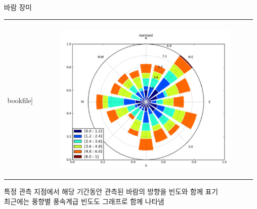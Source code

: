 \begin{frame}[t]{바람 장미}
	\begin{tabular}{ll}
		\begin{minipage}[t]{0.55\textwidth}\scriptsize
			\begin{figure}[t]
				\texttt{[image: \\bookfile]}
			\end{figure}	
		\end{minipage}	
		&
		\begin{minipage}[t]{0.4\textwidth} \scriptsize	
			\begin{figure}[t]
 				\includegraphics[width=\textwidth]{./images/Wind-rose}   
			\end{figure}	   
		\end{minipage}	
	\end{tabular}

		\scriptsize 
			특정 관측 지점에서 해당 기간동안 관측된 바람의 방향을 빈도와 함께 표기\\
			최근에는 풍향별 풍속계급 빈도도 그래프로 함께 나타냄

\end{frame}










